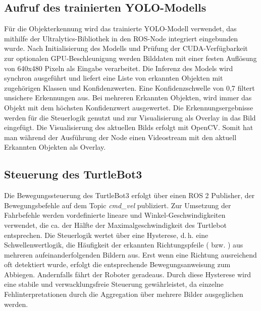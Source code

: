 \subsection{Aufruf des trainierten YOLO-Modells}
Für die Objekterkennung wird das trainierte YOLO-Modell verwendet, das mithilfe der Ultralytics-Bibliothek in den ROS-Node integriert eingebunden wurde. 
Nach Initialisierung des Modells und Prüfung der CUDA-Verfügbarkeit zur optionalen GPU-Beschleunigung werden Bilddaten mit einer festen Auflösung von 640x480 Pixeln als Eingabe verarbeitet.
\newPar
Die Inferenz des Models wird synchron ausgeführt und liefert eine Liste von erkannten Objekten mit zugehörigen Klassen und Konfidenzwerten. 
Eine Konfidenzschwelle von 0,7 filtert unsichere Erkennungen aus. 
Bei mehreren Erkannten Objekten, wird immer das Objekt mit dem höchsten Konfidenzwert ausgewertet.
Die Erkennungsergebnisse werden für die Steuerlogik genutzt und zur Visualisierung als Overlay in das Bild eingefügt.
Die Visualisierung des aktuellen Bilds erfolgt mit OpenCV.
Somit hat man während der Ausführung der Node einen Videostream mit den aktuell Erkannten Objekten als Overlay.
\subsection{Steuerung des TurtleBot3}
Die Bewegungssteuerung des TurtleBot3 erfolgt über einen ROS 2 Publisher, der Bewegungsbefehle auf dem Topic \textit{cmd\_vel} publiziert. 
Zur Umsetzung der Fahrbefehle werden vordefinierte lineare und Winkel\hyp{}Geschwindigkeiten verwendet, die ca. der Hälfte der Maximalgeschwindigkeit des Turtlebot entsprechen. 
\newPar
Die Steuerlogik wertet über eine Hysterese, d.\,h. eine Schwellenwertlogik, die Häufigkeit der erkannten Richtungspfeile ( bzw. ) aus mehreren aufeinanderfolgenden Bildern aus. 
Erst wenn eine Richtung ausreichend oft detektiert wurde, erfolgt die entsprechende Bewegungsanweisung zum Abbiegen. 
Andernfalls fährt der Roboter geradeaus.
Durch diese Hysterese wird eine stabile und verwacklungsfreie Steuerung gewährleistet, da einzelne Fehlinterpretationen durch die Aggregation über mehrere Bilder ausgeglichen werden. 
